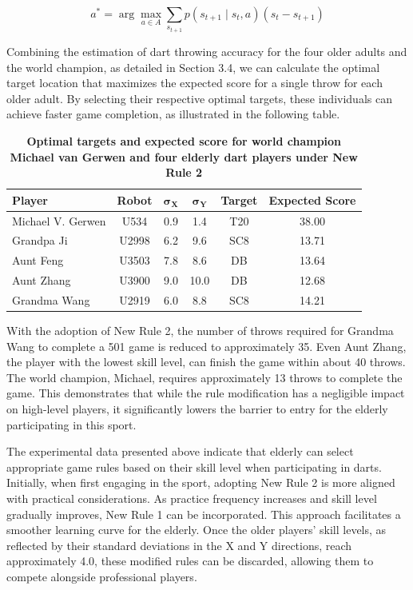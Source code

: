 \documentclass[cjjs]{ipart}
\theoremstyle{plain}
\begin{document}
\begin{equation}
a^* = \arg\max_{a \in A} \sum_{s_{t+1}} p(s_{t+1} \mid s_t, a) (s_t - s_{t+1})
\tag{8}
\end{equation}

Combining the estimation of dart throwing accuracy for the four older adults and the world champion, as detailed in Section 3.4, we can calculate the optimal target location that maximizes the expected score for a single throw for each older adult. By selecting their respective optimal targets, these individuals can achieve faster game completion, as illustrated in the following table.

\begin{table}[h]
    \centering
    \begin{tabular}{|l|c|c|c|c|c|}
        \hline
        \textbf{Player} & \textbf{Robot} & $\boldsymbol{\sigma_X}$ & $\boldsymbol{\sigma_Y}$ & \textbf{Target} & \textbf{Expected Score} \\
        \hline
        Michael V. Gerwen & U534  & 0.9  & 1.4  & T20  & 38.00 \\
        \hline
        Grandpa Ji       & U2998 & 6.2  & 9.6  & SC8  & 13.71 \\
        \hline
        Aunt Feng        & U3503 & 7.8  & 8.6  & DB   & 13.64 \\
        \hline
        Aunt Zhang       & U3900 & 9.0  & 10.0 & DB   & 12.68 \\
        \hline
        Grandma Wang     & U2919 & 6.0  & 8.8  & SC8  & 14.21 \\
        \hline
    \end{tabular}

    \caption{ \textbf{Optimal targets and expected score for world champion Michael van Gerwen and four elderly dart players under New Rule 2}}
   \end{table}

With the adoption of New Rule 2, the number of throws required for Grandma Wang to complete a 501 game is reduced to approximately 35. Even Aunt Zhang, the player with the lowest skill level, can finish the game within about 40 throws. The world champion, Michael, requires approximately 13 throws to complete the game. This demonstrates that while the rule modification has a negligible impact on high-level players, it significantly lowers the barrier to entry for the elderly participating in this sport.

The experimental data presented above indicate that elderly can select appropriate game rules based on their skill level when participating in darts. Initially, when first engaging in the sport, adopting New Rule 2 is more aligned with practical considerations. As practice frequency increases and skill level gradually improves, New Rule 1 can be incorporated. This approach facilitates a smoother learning curve for the elderly. Once the older players' skill levels, as reflected by their standard deviations in the X and Y directions, reach approximately 4.0, these modified rules can be discarded, allowing them to compete alongside professional players.
\end{document}
